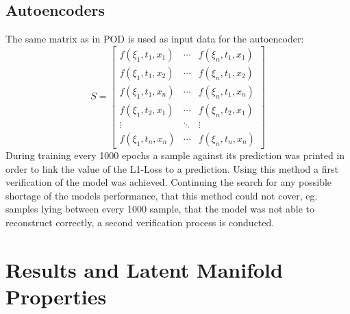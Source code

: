 \documentclass[12pt, a4paper]{article}
\begin{document}
\subsection{Autoencoders}
The same matrix as in POD is used as input data for the autoencoder:
\[S = \begin{bmatrix}
f(\xi_1,t_1,x_1)&\cdots &f(\xi_n,t_1,x_1) \\
f(\xi_1,t_1,x_2)&\cdots &f(\xi_n,t_1,x_2) \\
f(\xi_1,t_1,x_n)&\cdots &f(\xi_n,t_1,x_n)\\
f(\xi_1,t_2,x_1)&\cdots &f(\xi_n,t_2,x_1)\\
\vdots & \ddots & \vdots\\
f(\xi_1,t_n,x_n)&\cdots &f(\xi_n,t_n,x_n)
\end{bmatrix}\]
During training every 1000 epochs a sample against its prediction was printed in order to link the value of the L1-Loss to a prediction. Using this method a first verification of the model was achieved. Continuing the search for any possible shortage of the models performance, that this method could not cover, eg. samples lying between every 1000 sample, that the model was not able to reconstruct correctly, a second verification process is conducted. 
\section{Results and Latent Manifold Properties}
\end{document}
